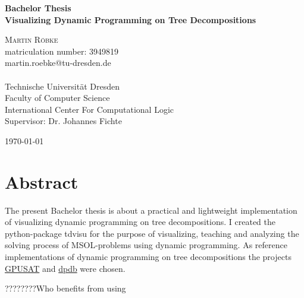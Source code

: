 \documentclass[a4paper, 12pt]{scrartcl}
\begin{document}
\begin{titlepage}
	\begin{center}
		{\Large\bfseries Bachelor Thesis}           \\[6.5ex]
		
		{\huge\bfseries Visualizing Dynamic Programming on Tree Decompositions}                  \\[6.5ex]
		
		\vspace{6ex}
				
		\textsc{\Large Martin Röbke}    \\[3ex]
		{\Large matriculation number: 3949819}    \\[2ex]
		{\Large martin.roebke@tu-dresden.de}    \\[2ex]
		\textsc{\large 
			}             \\[12ex]
		\vfill
		{\Large Technische Universität Dresden}               \\
		Faculty of Computer Science \\
		International Center For Computational Logic 		\\[5ex]
		
		{\Large Supervisor: Dr. Johannes Fichte}
		
		\vfill
		\today
	\end{center}
\end{titlepage}



\section*{Abstract}
\vspace{4ex}
The present Bachelor thesis is about a practical and lightweight implementation of visualizing dynamic programming on tree decompositions.
I created the python-package tdvisu for the purpose of visualizing, teaching and analyzing the solving process of MSOL-problems using dynamic programming.
As reference implementations of dynamic programming on tree decompositions the projects \href{https://github.com/daajoe/GPUSAT}{GPUSAT} and \href{https://github.com/hmarkus/dp_on_dbs}{dpdb} were chosen.

????????Who benefits from using

\newpage

\tableofcontents

\newpage
\end{document}
